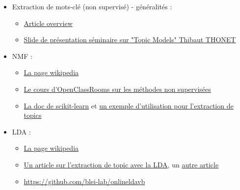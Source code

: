 \documentclass[a4paper,11pt]{article}
\begin{document}
\begin{itemize}
    \item Extraction de mots-clé (non supervisé) - généralités :
        \begin{itemize}
            \item {\color{blue} \href{https://jios.foi.hr/index.php/jios/article/view/938/724}{Article overview}}
            \item {\color{blue} \href{https://www.irit.fr/IRIS-site/images/seminairs/Thonet2016.pdf}{Slide de présentation séminaire sur "Topic Models" Thibaut THONET}}
        \end{itemize}
    \item NMF :
        \begin{itemize}
            \item {\color{blue} \href{https://en.wikipedia.org/wiki/Non-negative_matrix_factorization}{La page wikipedia}}
            \item {\color{blue} \href{https://openclassrooms.com/fr/courses/4379436-explorez-vos-donnees-avec-des-algorithmes-non-supervises/4379511-cherchez-les-variables-latentes-qui-expliquent-vos-donnees}{Le cours d'OpenClassRooms sur les méthodes non supervisées}}
            \item {\color{blue} \href{https://scikit-learn.org/stable/modules/generated/sklearn.decomposition.NMF.html}{La doc de scikit-learn}} et {\color{blue}\href{https://scikit-learn.org/stable/auto_examples/applications/plot_topics_extraction_with_nmf_lda.html#sphx-glr-auto-examples-applications-plot-topics-extraction-with-nmf-lda-py}{un exemple d'utilisation pour l'extraction de topics}}
        \end{itemize}
    \item LDA : 
        \begin{itemize}
            \item {\color{blue} \href{https://fr.wikipedia.org/wiki/Allocation_de_Dirichlet_latente}{La page wikipedia}}
            \item {\color{blue} \href{https://www.analyticsvidhya.com/blog/2021/06/part-2-topic-modeling-and-latent-dirichlet-allocation-lda-using-gensim-and-sklearn/}{Un article sur l'extraction de topic avec la LDA}}, un {\color{blue} \href{https://towardsdatascience.com/light-on-math-machine-learning-intuitive-guide-to-latent-dirichlet-allocation-437c81220158}{autre article}}
            \item {\color{blue} \href{La page du code de l'article original}{https://github.com/blei-lab/onlineldavb}}
        \end{itemize}

\end{itemize}
\end{document}
